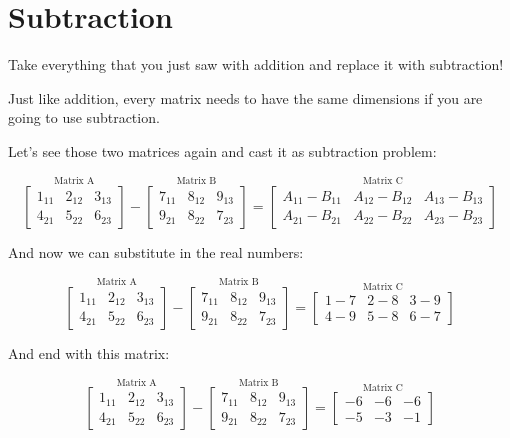 \documentclass[
  letterpaper,
]{krantz}
\begin{document}
\section{Subtraction}\label{subtraction}

Take everything that you just saw with addition and replace it with
subtraction!

Just like addition, every matrix needs to have the same dimensions if
you are going to use subtraction.

Let's see those two matrices again and cast it as subtraction problem:

\[
\stackrel{\mbox{Matrix A}}{
\begin{bmatrix}
1_{11} & 2_{12} & 3_{13}\\
4_{21} & 5_{22} & 6_{23}
\end{bmatrix}
}
-
\stackrel{\mbox{Matrix B}}{
\begin{bmatrix}
7_{11} & 8_{12} & 9_{13}\\
9_{21} & 8_{22} & 7_{23}
\end{bmatrix} 
}
=
\stackrel{\mbox{Matrix C}}{
\begin{bmatrix}
A_{11} - B_{11}& A_{12} - B_{12} & A_{13} - B_{13}\\
A_{21} - B_{21}& A_{22} - B_{22} & A_{23} - B_{23}
\end{bmatrix}
}
\]

And now we can substitute in the real numbers:

\[
\stackrel{\mbox{Matrix A}}{
\begin{bmatrix}
1_{11} & 2_{12} & 3_{13}\\
4_{21} & 5_{22} & 6_{23}
\end{bmatrix}
}
-
\stackrel{\mbox{Matrix B}}{
\begin{bmatrix}
7_{11} & 8_{12} & 9_{13}\\
9_{21} & 8_{22} & 7_{23}
\end{bmatrix} 
}
=
\stackrel{\mbox{Matrix C}}{
\begin{bmatrix}
1 - 7 & 2 - 8 & 3 - 9\\
4 - 9 & 5 - 8 & 6 - 7
\end{bmatrix}
}
\]

And end with this matrix:

\[
\stackrel{\mbox{Matrix A}}{
\begin{bmatrix}
1_{11} & 2_{12} & 3_{13}\\
4_{21} & 5_{22} & 6_{23}
\end{bmatrix}
}
-
\stackrel{\mbox{Matrix B}}{
\begin{bmatrix}
7_{11} & 8_{12} & 9_{13}\\
9_{21} & 8_{22} & 7_{23}
\end{bmatrix} 
}
=
\stackrel{\mbox{Matrix C}}{
\begin{bmatrix}
-6 & -6 & -6 \\
-5 & -3 & -1
\end{bmatrix}
}
\]
\end{document}
